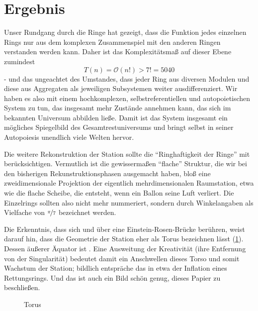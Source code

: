 \section*{Ergebnis}\label{sec:ergebnis}

Unser Rundgang durch die Ringe hat gezeigt, dass die Funktion jedes einzelnen Rings nur aus dem komplexen Zusammenspiel mit den anderen Ringen verstanden werden kann. Daher ist das Komplexitätsmaß auf dieser Ebene zumindest
\begin{equation}
    T(n) = \mathcal{O} (n!) > 7! = 5040
\end{equation}
- und das ungeachtet des Umstandes, dass jeder Ring aus diversen Modulen und diese aus Aggregaten als jeweiligen Subsystemen weiter ausdifferenziert. Wir haben es also mit einem hochkomplexen, selbstreferentiellen und autopoietischen System zu tun, das insgesamt mehr Zustände annehmen kann, das sich im bekannten Universum abbilden ließe. Damit ist das System insgesamt ein mögliches Spiegelbild des Gesamtrestuniversums und bringt selbst in seiner Autopoiesis unendlich viele Welten hervor.

Die weitere Rekonstruktion der Station sollte die "`Ringhaftigkeit der Ringe"' mit berücksichtigen. Vermutlich ist die gewissermaßen "`flache"' Struktur, die wir bei den bisherigen Rekunstruktionsphasen ausgemacht haben, bloß eine zweidimensionale Projektion der eigentlich mehrdimensionalen Raumstation, etwa wie die flache Scheibe, die entsteht, wenn ein Ballon seine Luft verliert. Die Einzelrings sollten also nicht mehr nummeriert, sondern durch Winkelangaben als Vielfache von $\nicefrac{\pi}{7}$ bezeichnet werden.

Die Erkenntnis, dass sich  und  über eine Einstein-Rosen-Brücke berühren, weist darauf hin, dass die Geometrie der Station eher als Torus bezeichnen lässt (\cref{fig:torus}). Dessen äußerer Äquator ist . Eine Ausweitung der Kreativität (ihre Entfernung von der Singularität) bedeutet damit ein Anschwellen dieses Torso und somit Wachstum der Station; bildlich entspräche das in etwa der Inflation eines Rettungsrings. Und das ist auch ein Bild schön genug, dieses Papier zu beschließen.

\begin{figure}[ht!]
    \centering
    \resizebox{0.4\textwidth}{!}{
        
    }
    \vspace{2cm}
    \caption{Torus}
    \label{fig:torus}
\end{figure}
